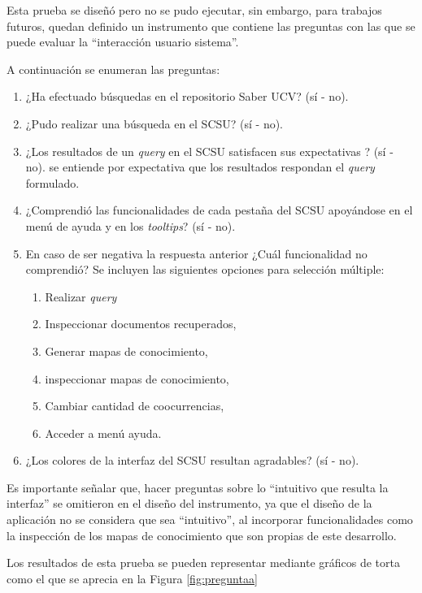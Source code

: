 \documentclass[
  12pt,
  openany]{book}
\begin{document}
Esta prueba se diseñó pero no se pudo ejecutar, sin embargo, para trabajos futuros, quedan definido un instrumento que contiene las preguntas con las que se puede evaluar la ``interacción usuario sistema''.

A continuación se enumeran las preguntas:

\begin{enumerate}
\def\labelenumi{\arabic{enumi}.}
\item
  ¿Ha efectuado búsquedas en el repositorio Saber UCV? (sí - no).
\item
  ¿Pudo realizar una búsqueda en el SCSU? (sí - no).
\item
  ¿Los resultados de un \emph{query} en el SCSU satisfacen sus expectativas ? (sí - no). se entiende por expectativa que los resultados respondan el \emph{query} formulado.
\item
  ¿Comprendió las funcionalidades de cada pestaña del SCSU apoyándose en el menú de ayuda y en los \emph{tooltips}? (sí - no).
\item
  En caso de ser negativa la respuesta anterior ¿Cuál funcionalidad no comprendió? Se incluyen las siguientes opciones para selección múltiple:

  \begin{enumerate}
  \def\labelenumii{\arabic{enumii}.}
  \item
    Realizar \emph{query}
  \item
    Inspeccionar documentos recuperados,
  \item
    Generar mapas de conocimiento,
  \item
    inspeccionar mapas de conocimiento,
  \item
    Cambiar cantidad de coocurrencias,
  \item
    Acceder a menú ayuda.
  \end{enumerate}
\item
  ¿Los colores de la interfaz del SCSU resultan agradables? (sí - no).
\end{enumerate}

Es importante señalar que, hacer preguntas sobre lo ``intuitivo que resulta la interfaz'' se omitieron en el diseño del instrumento, ya que el diseño de la aplicación no se considera que sea ``intuitivo'', al incorporar funcionalidades como la inspección de los mapas de conocimiento que son propias de este desarrollo.

Los resultados de esta prueba se pueden representar mediante gráficos de torta como el que se aprecia en la Figura \ref{fig:preguntaa}
\end{document}
